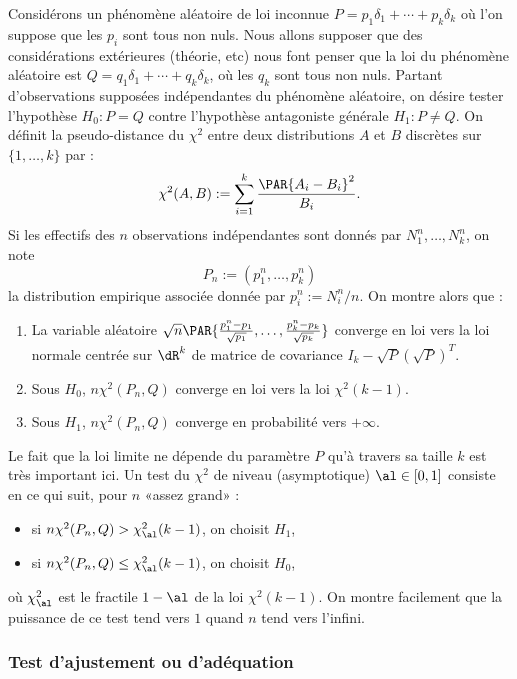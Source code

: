 Considérons un phénomène aléatoire de loi inconnue $P=p_1\delta_1+\cdots+p_k\delta_k$ où
l'on suppose que les $p_i$ sont tous non nuls. Nous allons supposer que des
considérations extérieures (théorie, etc) nous font penser que la loi du
phénomène aléatoire est $Q=q_1\delta_1+\cdots+q_k\delta_k$, où les $q_k$ sont tous non
nuls. Partant d'observations supposées indépendantes du phénomène aléatoire,
on désire tester l'hypothèse $H_0 : P=Q$ contre l'hypothèse antagoniste
générale $H_1: P\neq Q$. On définit la pseudo-distance du $\chi^2$ entre deux
distributions $A$ et $B$ discrètes sur $\{1,\ldots,k\}$ par :
$$
\chi^2(A,B):=\sum_{i=1}^k \frac{\PAR{A_i-B_i}^2}{B_i}.
$$
Si les effectifs des $n$ observations indépendantes sont donnés par
$N_1^n,\ldots,N_k^n$, on note 
$$
P_n:=(p^n_1,\ldots,p^n_k)
$$ 
la distribution empirique associée donnée par $p^n_i:=N_i^n/n$. 
On montre alors que :
\begin{enumerate}
\item La variable aléatoire $\sqrt{n}
  \PAR{\frac{p_1^n-p_1}{\sqrt{p_1}},\ldots,\frac{p_k^n-p_k}{\sqrt{p_k}}}$
  converge en loi vers la loi normale centrée sur $\dR^k$ de matrice de
  covariance $I_k-\sqrt{P}(\sqrt{P})^T$.
\item Sous $H_0$, $n\chi^2(P_n,Q)$ converge en loi vers la loi $\chi^2(k-1)$.
\item Sous $H_1$, $n\chi^2(P_n,Q)$ converge en probabilité vers $+\infty$.
\end{enumerate}
Le fait que la loi limite ne dépende du paramètre $P$ qu'à travers sa taille
$k$ est très important ici.  Un test du $\chi^2$ de niveau (asymptotique)
$\al\in[0,1]$ consiste en ce qui suit, pour $n$ «assez grand» :
\begin{itemize}
\item si $n\chi^2(P_n,Q)>\chi_\al^2(k-1)$, on choisit $H_1$,
\item si $n\chi^2(P_n,Q)\leq\chi_\al^2(k-1)$, on choisit $H_0$,
\end{itemize}
où $\chi^2_\al$ est le fractile $1-\al$ de la loi $\chi^2(k-1)$.
On montre facilement que la puissance de ce test tend vers $1$ quand $n$ tend
vers l'infini.

\subsubsection{Test d'ajustement ou d'adéquation}

